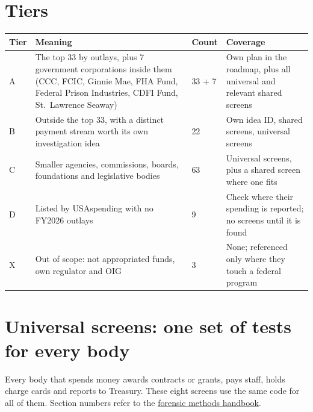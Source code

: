 \documentclass[letterpaper,11pt]{article}
\begin{document}
\hypertarget{tiers}{%
\section{Tiers}\label{tiers}}

\begingroup\small\setlength{\tabcolsep}{4pt}\renewcommand{\arraystretch}{1.25}
\begin{longtable}[l]{@{}l>{\raggedright\arraybackslash}p{}l>{\raggedright\arraybackslash}p{}@{}}
\rowcolor{coolblack}\leavevmode\color{white}\bfseries Tier & \leavevmode\color{white}\bfseries Meaning & \leavevmode\color{white}\bfseries Count & \leavevmode\color{white}\bfseries Coverage \\
\endhead
A & The top 33 by outlays, plus 7 government corporations inside them (CCC, FCIC, Ginnie Mae, FHA Fund, Federal Prison Industries, CDFI Fund, St.~Lawrence Seaway) & 33 + 7 & Own plan in the roadmap, plus all universal and relevant shared screens \\
B & Outside the top 33, with a distinct payment stream worth its own investigation idea & 22 & Own idea ID, shared screens, universal screens \\
C & Smaller agencies, commissions, boards, foundations and legislative bodies & 63 & Universal screens, plus a shared screen where one fits \\
D & Listed by USAspending with no FY2026 outlays & 9 & Check where their spending is reported; no screens until it is found \\
X & Out of scope: not appropriated funds, own regulator and OIG & 3 & None; referenced only where they touch a federal program \\
\end{longtable}\endgroup

\hypertarget{universal-screens-one-set-of-tests-for-every-body}{%
\section{Universal screens: one set of tests for every
body}\label{universal-screens-one-set-of-tests-for-every-body}}

Every body that spends money awards contracts or grants, pays staff,
holds charge cards and reports to Treasury. These eight screens use the
same code for all of them. Section numbers refer to the
\href{../playbook/forensic_methods.pdf}{forensic methods handbook}.
\end{document}
